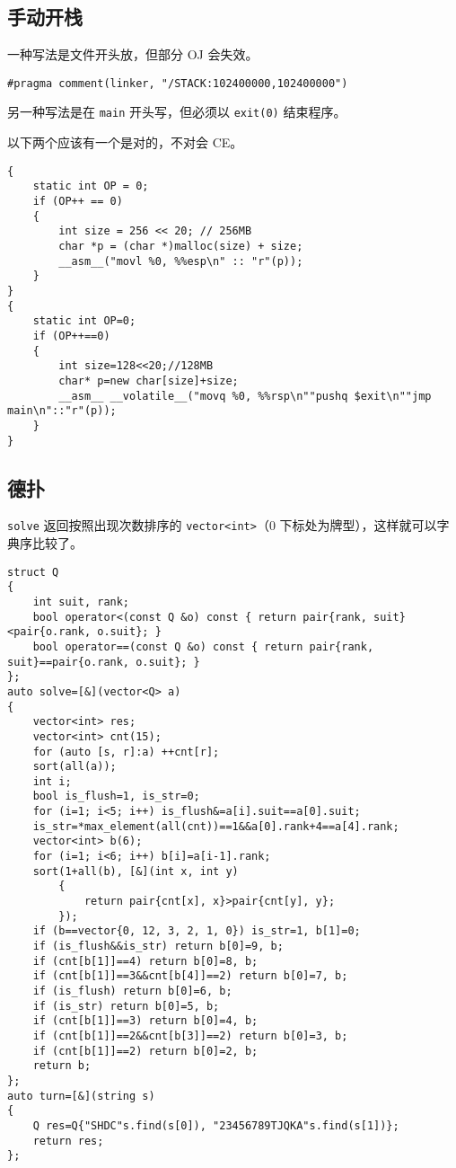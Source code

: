 \documentclass[12pt]{ctexart}
\begin{document}
\subsection{手动开栈}

一种写法是文件开头放，但部分 OJ 会失效。

\begin{lstlisting}
#pragma comment(linker, "/STACK:102400000,102400000")
\end{lstlisting}

另一种写法是在 \verb|main| 开头写，但必须以 \verb|exit(0)| 结束程序。

以下两个应该有一个是对的，不对会 CE。

\begin{lstlisting}
{
	static int OP = 0;
	if (OP++ == 0)
	{
		int size = 256 << 20; // 256MB
		char *p = (char *)malloc(size) + size;
		__asm__("movl %0, %%esp\n" :: "r"(p));
	}
}
{
	static int OP=0;
	if (OP++==0)
	{
		int size=128<<20;//128MB
		char* p=new char[size]+size;
		__asm__ __volatile__("movq %0, %%rsp\n""pushq $exit\n""jmp main\n"::"r"(p));
	}
}
\end{lstlisting}

\subsection{德扑}

\verb|solve| 返回按照出现次数排序的 \verb|vector<int>|（$0$ 下标处为牌型），这样就可以字典序比较了。

\begin{lstlisting}
struct Q
{
	int suit, rank;
	bool operator<(const Q &o) const { return pair{rank, suit}<pair{o.rank, o.suit}; }
	bool operator==(const Q &o) const { return pair{rank, suit}==pair{o.rank, o.suit}; }
};
auto solve=[&](vector<Q> a)
{
	vector<int> res;
	vector<int> cnt(15);
	for (auto [s, r]:a) ++cnt[r];
	sort(all(a));
	int i;
	bool is_flush=1, is_str=0;
	for (i=1; i<5; i++) is_flush&=a[i].suit==a[0].suit;
	is_str=*max_element(all(cnt))==1&&a[0].rank+4==a[4].rank;
	vector<int> b(6);
	for (i=1; i<6; i++) b[i]=a[i-1].rank;
	sort(1+all(b), [&](int x, int y)
		{
			return pair{cnt[x], x}>pair{cnt[y], y};
		});
	if (b==vector{0, 12, 3, 2, 1, 0}) is_str=1, b[1]=0;
	if (is_flush&&is_str) return b[0]=9, b;
	if (cnt[b[1]]==4) return b[0]=8, b;
	if (cnt[b[1]]==3&&cnt[b[4]]==2) return b[0]=7, b;
	if (is_flush) return b[0]=6, b;
	if (is_str) return b[0]=5, b;
	if (cnt[b[1]]==3) return b[0]=4, b;
	if (cnt[b[1]]==2&&cnt[b[3]]==2) return b[0]=3, b;
	if (cnt[b[1]]==2) return b[0]=2, b;
	return b;
};
auto turn=[&](string s)
{
	Q res=Q{"SHDC"s.find(s[0]), "23456789TJQKA"s.find(s[1])};
	return res;
};
\end{lstlisting}
\end{document}
